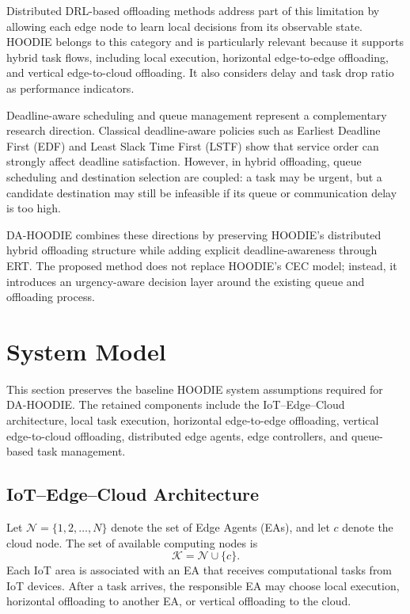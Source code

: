 \documentclass{article}
\begin{document}
Distributed DRL-based offloading methods address part of this limitation by allowing each edge node to learn local decisions from its observable state. HOODIE belongs to this category and is particularly relevant because it supports hybrid task flows, including local execution, horizontal edge-to-edge offloading, and vertical edge-to-cloud offloading. It also considers delay and task drop ratio as performance indicators.

Deadline-aware scheduling and queue management represent a complementary research direction. Classical deadline-aware policies such as Earliest Deadline First (EDF) and Least Slack Time First (LSTF) show that service order can strongly affect deadline satisfaction. However, in hybrid offloading, queue scheduling and destination selection are coupled: a task may be urgent, but a candidate destination may still be infeasible if its queue or communication delay is too high.

DA-HOODIE combines these directions by preserving HOODIE's distributed hybrid offloading structure while adding explicit deadline-awareness through ERT. The proposed method does not replace HOODIE's CEC model; instead, it introduces an urgency-aware decision layer around the existing queue and offloading process.

\section{System Model}
\label{sec:system_model}

This section preserves the baseline HOODIE system assumptions required for DA-HOODIE. The retained components include the IoT--Edge--Cloud architecture, local task execution, horizontal edge-to-edge offloading, vertical edge-to-cloud offloading, distributed edge agents, edge controllers, and queue-based task management.

\subsection{IoT--Edge--Cloud Architecture}
\label{subsec:iot_edge_cloud_architecture}

Let $\mathcal{N}=\{1,2,\ldots,N\}$ denote the set of Edge Agents (EAs), and let $c$ denote the cloud node. The set of available computing nodes is
\begin{equation}
    \mathcal{K}=\mathcal{N}\cup\{c\}.
\end{equation}
Each IoT area is associated with an EA that receives computational tasks from IoT devices. After a task arrives, the responsible EA may choose local execution, horizontal offloading to another EA, or vertical offloading to the cloud.
\end{document}
